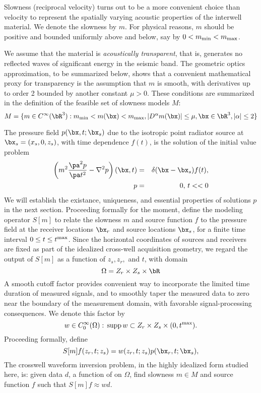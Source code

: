 Slowness (reciprocal velocity) turns out to be a more convenient
choice than velocity to represent the spatially varying acoustic
properties of the interwell material. We denote the slowness by $m$.
For physical reasons, $m$ should be positive and bounded uniformly above and 
below, say by $0 < m_{\rm min} < m_{\rm max}$.

We assume that the
material is {\em acoustically transparent}, that is, generates no
reflected waves of significant energy in the seismic band. The geometric
optics approximation, to be summarized below, shows that a convenient
mathematical proxy for transparency is the assumption that $m$ is
smooth, with derivatives up to
order 2 bounded by another constant $\mu > 0$. These conditions are
summarized in the definition of the feasible set of slowness models $M$:
\begin{equation}
\label{eqn:vfeas}
M=\{m \in C^{\infty}(\bR^3): m_{\rm min} < m(\bx) < m_{\rm max},
|D^{\alpha}m(\bx)| \le \mu,
\bx \in \bR^3, |\alpha| \le 2\}
\end{equation}

The pressure field 
$p(\bx,t;\bx_s)$ due to the isotropic point radiator source at 
$\bx_s=(x_s,0,z_s)$, with time dependence $f(t)$, is the solution of the initial value problem 
\begin{eqnarray}
\left(m^2 \frac{\pa^2 p}{\pa t^2} - \nabla^2 p\right)(\bx,t) &=&
     \delta(\bx-\bx_s) f(t), \nonumber \\
 p&=&0, \, t<<0 \label{eqn:pressure}
\end{eqnarray}
We will establish the existance, uniqueness, and essential properties
of solutions $p$ in the next section. Proceeding formally for the moment,
define the modeling operator $S[m]$ to relate the slowness $m$ and
source function $f$ to the pressure field at the receiver locations
$\bx_r$ and source locations $\bx_s$, for a finite time interval $0
\le t \le t^{\rm max}$. Since the horizontal coordinates of sources and
receivers are fixed as part of the idealized cross-well acquisition
geometry, we regard the output of $S[m]$ as a function of $z_s,z_r,$
and $t$, with domain
\begin{equation}
\label{eqn:omdef}
\Omega = Z_r\times Z_s \times \bR
\end{equation}
 A smooth cutoff factor provides
convenient way to incorporate the limited time duration of measured
signals, and to smoothly taper the measured data to zero near the
boundary of the measurement domain, with favorable signal-processing
consequences. We denote this factor by
\begin{equation}
\label{eqn:wdef}
w \in C_0^{\infty}( \Omega): \,{\rm supp}\,w \subset 
Z_r\times Z_s \times (0,t^{\rm max}).
\end{equation}
Proceeding formally, define
\begin{equation}
\label{eqn:sdef}
S[m]f(z_r,t;z_s) = w(z_r,t;z_s) p(\bx_r,t;\bx_s), 
\end{equation}
The crosswell waveform inversion problem, in the highly idealized form 
studied here, is: given data $d$, a function of on $\Omega$,
find slowness $m \in M$ and source function $f$ such that 
$S[m]f \approx wd$. 


